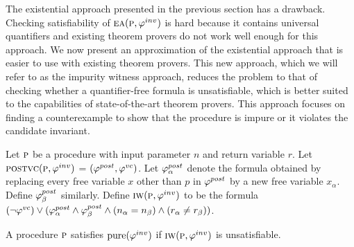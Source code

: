 The existential approach presented in the previous section has a drawback. Checking satisfiability of $\textsc{ea}(\textsc{p},\varphi^{inv})$
is hard because it contains universal quantifiers and existing theorem provers do not work well enough for this
approach. We now present an approximation of the existential approach that is easier to use with existing theorem
provers. This new approach, which we will refer to as the impurity witness approach, reduces the problem to
that of checking whether a quantifier-free formula is unsatisfiable, which is better suited to the capabilities of
state-of-the-art theorem provers. This approach focuses on finding a counterexample to show that the
procedure is impure or it violates the candidate invariant.

Let $\textsc{p}$ be a procedure with input parameter $n$ and return variable $r$.
Let $\textsc{postvc}({\textsc{p}},{\varphi^{inv}})$ = $(\varphi^{post},\varphi^{vc})$.
Let $\varphi^{post}_\alpha$ denote the formula obtained by replacing every free variable $x$ other than $p$ in $\varphi^{post}$
by a new free variable $x_\alpha$. Define $\varphi^{post}_\beta$ similarly.
Define $\textsc{iw}(\textsc{p}, \varphi^{inv})$ to be the formula $(\neg \varphi^{vc}) \vee (\varphi^{post}_\alpha \wedge \varphi^{post}_\beta \wedge (n_\alpha = n_\beta) \wedge (r_\alpha \neq r_\beta))$.

\begin{theorem}
A procedure $\textsc{p}$ satisfies  $\mathrm{pure}(\varphi^{inv})$ if $\textsc{iw}(\textsc{p}, \varphi^{inv})$ is unsatisfiable.
\end{theorem}

